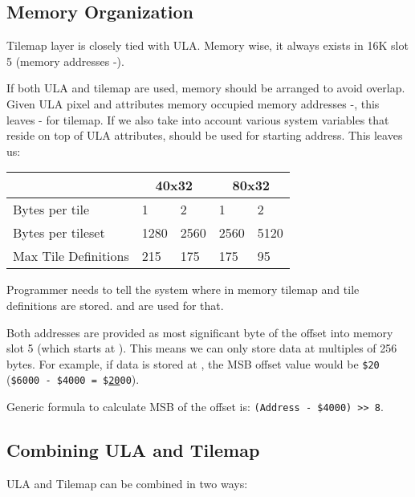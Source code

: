 \subsection{Memory Organization}

Tilemap layer is closely tied with ULA. Memory wise, it always exists in 16K slot 5 (memory addresses -).

If both ULA and tilemap are used, memory should be arranged to avoid overlap. Given ULA pixel and attributes memory occupied memory addresses -, this leaves - for tilemap. If we also take into account various system variables that reside on top of ULA attributes,  should be used for starting address. This leaves us:

{
	\def\arraystretch{1.2}
	\begin{tabular}{|l|l|l|l|l|}
		\hline
		& \multicolumn{2}{c|}{40x32} & \multicolumn{2}{c|}{80x32} \\
		\hline
		Bytes per tile & 1 & 2 & 1 & 2 \\
		\hline
		Bytes per tileset & 1280 & 2560 & 2560 & 5120 \\
		\hline
		Max Tile Definitions & 215 & 175 & 175 & 95 \\
		\hline
	\end{tabular}
}

Programmer needs to tell the system where in memory tilemap and tile definitions are stored.  and  are used for that.

Both addresses are provided as most significant byte of the offset into memory slot 5 (which starts at ). This means we can only store data at multiples of 256 bytes. For example, if data is stored at , the MSB offset value would be {\tt \$20} ({\tt \$6000 - \$4000 = \$\underline{20}00}).

Generic formula to calculate MSB of the offset is: {\tt (Address - \$4000) >> 8}.


\subsection{Combining ULA and Tilemap}

ULA and Tilemap can be combined in two ways:

